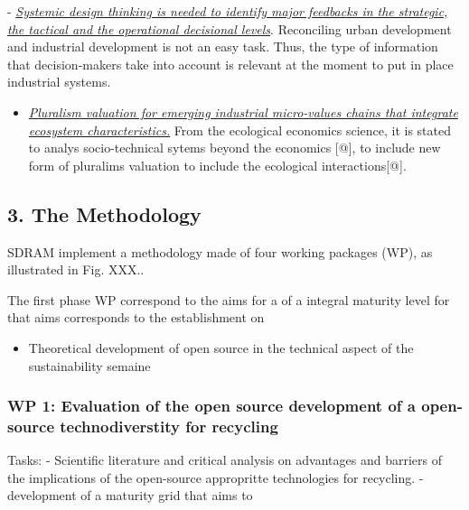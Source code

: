 \documentclass[
  11pt,
  a4paperpaper,
  onecolumn]{article}
\providecommand{\tightlist}{%
  \setlength{\itemsep}{0pt}\setlength{\parskip}{0pt}}\usepackage{longtable,booktabs,array}
\begin{document}
-
\textit{\underline{Systemic design thinking is needed to identify major feedbacks in the strategic, the tactical and the operational decisional levels}}.
Reconciling urban development and industrial development is not an easy
task. Thus, the type of information that decision-makers take into
account is relevant at the moment to put in place industrial systems.

\begin{itemize}
\tightlist
\item
  \textit{\underline{Pluralism valuation for emerging industrial micro-values chains that integrate ecosystem characteristics.}}
  From the ecological economics science, it is stated to analys
  socio-technical sytems beyond the economics {[}@{]}, to include new
  form of pluralims valuation to include the ecological
  interactions{[}@{]}.
\end{itemize}

\hypertarget{the-methodology}{%
\subsection{3. The Methodology}\label{the-methodology}}

SDRAM implement a methodology made of four working packages (WP), as
illustrated in Fig. XXX..

The first phase WP correspond to the aims for a of a integral maturity
level for that aims corresponds to the establishment on

\begin{itemize}
\tightlist
\item
  Theoretical development of open source in the technical aspect of the
  sustainability semaine
\end{itemize}

\hypertarget{wp-1-evaluation-of-the-open-source-development-of-a-open-source-technodiverstity-for-recycling}{%
\subsubsection{WP 1: Evaluation of the open source development of a
open-source technodiverstity for
recycling}\label{wp-1-evaluation-of-the-open-source-development-of-a-open-source-technodiverstity-for-recycling}}

Tasks: - Scientific literature and critical analysis on advantages and
barriers of the implications of the open-source appropritte technologies
for recycling. - development of a maturity grid that aims to
\end{document}
